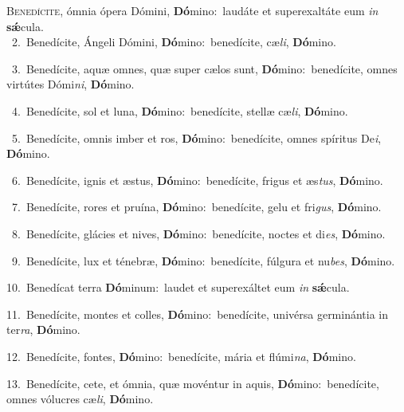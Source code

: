 \lettrine{\initial\textcolor{\initialcolor}{B}}{enedícite,} ómnia ópera Dómini, \textbf{Dó}\-mino:~\star laudáte et superexaltáte eum \textit{in} \textbf{sǽ}\-cula.\\
{\numbfont\textcolor{\numbcolor}{~2.}}~Benedícite, Ángeli Dómini, \textbf{Dó}\-mino:~\star benedícite, cæ\-\textit{li}\-, \textbf{Dó}\-mino.\par
{\numbfont\textcolor{\numbcolor}{~3.}}~Benedícite, aquæ omnes, quæ super cælos sunt, \textbf{Dó}\-mino:~\star benedícite, omnes virtútes Dómi\-\textit{ni}\-, \textbf{Dó}\-mino.\par
{\numbfont\textcolor{\numbcolor}{~4.}}~Benedícite, sol et luna, \textbf{Dó}\-mino:~\star benedícite, stellæ cæ\-\textit{li}\-, \textbf{Dó}\-mino.\par
{\numbfont\textcolor{\numbcolor}{~5.}}~Benedícite, omnis imber et ros, \textbf{Dó}\-mino:~\star benedícite, omnes spíritus De\-\textit{i}\-, \textbf{Dó}\-mino.\par
{\numbfont\textcolor{\numbcolor}{~6.}}~Benedícite, ignis et æstus, \textbf{Dó}\-mino:~\star benedícite, frigus et æs\-\textit{tus}\-, \textbf{Dó}\-mino.\par
{\numbfont\textcolor{\numbcolor}{~7.}}~Benedícite, rores et pruína, \textbf{Dó}\-mino:~\star benedícite, gelu et fri\-\textit{gus}\-, \textbf{Dó}\-mino.\par
{\numbfont\textcolor{\numbcolor}{~8.}}~Benedícite, glácies et nives, \textbf{Dó}\-mino:~\star benedícite, noctes et di\-\textit{es}\-, \textbf{Dó}\-mino.\par
{\numbfont\textcolor{\numbcolor}{~9.}}~Benedícite, lux et ténebræ, \textbf{Dó}\-mino:~\star benedícite, fúlgura et nu\-\textit{bes}\-, \textbf{Dó}\-mino.\par
{\numbfont\textcolor{\numbcolor}{10.}}~Benedícat terra \textbf{Dó}\-minum:~\star laudet et superexáltet eum \textit{in} \textbf{sǽ}\-cula.\par
{\numbfont\textcolor{\numbcolor}{11.}}~Benedícite, montes et colles, \textbf{Dó}\-mino:~\star benedícite, univérsa germinántia in ter\-\textit{ra}\-, \textbf{Dó}\-mino.\par
{\numbfont\textcolor{\numbcolor}{12.}}~Benedícite, fontes, \textbf{Dó}\-mino:~\star benedícite, mária et flúmi\-\textit{na}\-, \textbf{Dó}\-mino.\par
{\numbfont\textcolor{\numbcolor}{13.}}~Benedícite, cete, et ómnia, quæ movéntur in aquis, \textbf{Dó}\-mino:~\star benedícite, omnes vólucres cæ\-\textit{li}\-, \textbf{Dó}\-mino.\par
